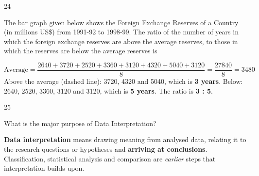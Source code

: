 \begin{question}{24}
{The bar graph given below shows the Foreign Exchange Reserves of a Country (in millions US\$) from 1991-92 to 1998-99. The ratio of the number of years in which the foreign exchange reserves are above the average reserves, to those in which the reserves are below the average reserves is\par}
\begin{explain}
\[\text{Average}=\frac{2640+3720+2520+3360+3120+4320+5040+3120}{8}=\frac{27840}{8}=3480\]
Above the average (dashed line): 3720, 4320 and 5040, which is \textbf{3 years}. Below: 2640, 2520, 3360, 3120 and 3120, which is \textbf{5 years}. The ratio is \textbf{3 : 5}.
\end{explain}
\end{question}

\begin{question}{25}
{What is the major purpose of Data Interpretation?\par}
\begin{explain}
\textbf{Data interpretation} means drawing meaning from analysed data, relating it to the research questions or hypotheses and \textbf{arriving at conclusions}. Classification, statistical analysis and comparison are \emph{earlier} steps that interpretation builds upon.
\end{explain}
\end{question}

